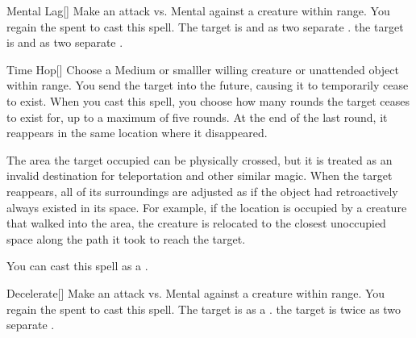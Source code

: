 \lowercase{\hypertarget{spell:Mental Lag}{}}\label{spell:Mental Lag}
\begin{apability}[\nth{2}]{\hypertarget{spell:Mental Lag}{Mental Lag}}[]
Make an attack vs. Mental against a creature within \rngmed range.
\miss You regain the  spent to cast this spell.
\hit The target is  and  as two separate .
\crit the target is  and  as two separate .
\end{apability}
\vspace{0.25em}



\lowercase{\hypertarget{spell:Time Hop}{}}\label{spell:Time Hop}
\begin{apability}[\nth{2}]{\hypertarget{spell:Time Hop}{Time Hop}}[]
Choose a Medium or smalller willing creature or unattended object within \rngmed range.
You send the target into the future, causing it to temporarily cease to exist.
When you cast this spell, you choose how many rounds the target ceases to exist for, up to a maximum of five rounds.
At the end of the last round, it reappears in the same location where it disappeared.

The area the target occupied can be physically crossed, but it is treated as an invalid destination for teleportation and other similar magic.
When the target reappears, all of its surroundings are adjusted as if the object had retroactively always existed in its space.
For example, if the location is occupied by a creature that walked into the area, the creature is relocated to the closest unoccupied space along the path it took to reach the target.

You can cast this spell as a .
\end{apability}
\vspace{0.25em}



\lowercase{\hypertarget{spell:Decelerate}{}}\label{spell:Decelerate}
\begin{apability}[\nth{3}]{\hypertarget{spell:Decelerate}{Decelerate}}[]
Make an attack vs. Mental against a creature within \rngmed range.
\miss You regain the  spent to cast this spell.
\hit The target is  as a .
\crit the target is  twice as two separate .
\end{apability}
\vspace{0.25em}



